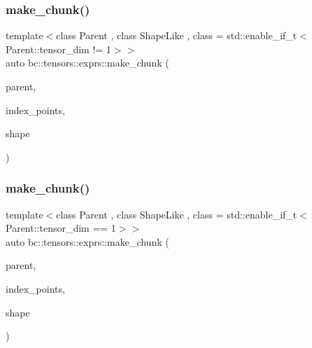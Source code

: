 \mbox{\label{namespacebc_1_1tensors_1_1exprs_a2e5939ce461ae028e12be94821239785}} 
\subsubsection{\texorpdfstring{make\+\_\+chunk()}{make\_chunk()}\hspace{0.1cm}{\footnotesize\ttfamily [1/2]}}
{\footnotesize\ttfamily template$<$class Parent , class Shape\+Like , class  = std\+::enable\+\_\+if\+\_\+t$<$\+Parent\+::tensor\+\_\+dim != 1$>$$>$ \\
auto bc\+::tensors\+::exprs\+::make\+\_\+chunk (\begin{DoxyParamCaption}\item[{Parent \&}]{parent,  }\item[{\hyperlink{structbc_1_1Dim}{bc\+::\+Dim}$<$ Parent\+::tensor\+\_\+dim $>$}]{index\+\_\+points,  }\item[{Shape\+Like}]{shape }\end{DoxyParamCaption})}

\mbox{\label{namespacebc_1_1tensors_1_1exprs_a08fc131daf9ebc11798cec3668ebfca8}} 
\subsubsection{\texorpdfstring{make\+\_\+chunk()}{make\_chunk()}\hspace{0.1cm}{\footnotesize\ttfamily [2/2]}}
{\footnotesize\ttfamily template$<$class Parent , class Shape\+Like , class  = std\+::enable\+\_\+if\+\_\+t$<$\+Parent\+::tensor\+\_\+dim == 1$>$$>$ \\
auto bc\+::tensors\+::exprs\+::make\+\_\+chunk (\begin{DoxyParamCaption}\item[{Parent \&}]{parent,  }\item[{\hyperlink{structbc_1_1Dim}{bc\+::\+Dim}$<$ 1 $>$}]{index\+\_\+points,  }\item[{Shape\+Like}]{shape }\end{DoxyParamCaption})}

